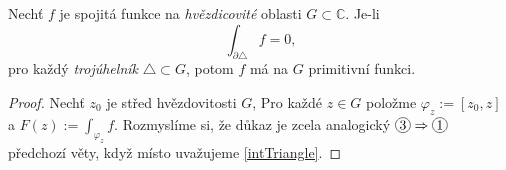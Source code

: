 \begin{amendment}
Nechť $f$ je spojitá funkce na \emph{hvězdicovité} oblasti $G\subset\mathbb{C}.$ Je-li
\begin{equation}\label{intTriangle}
    \int_{\partial\triangle}f=0\text{,}
\end{equation}
pro každý \emph{trojúhelník} $\triangle\subset G$, potom $f$ má na $G$ primitivní funkci.
\end{amendment}

\begin{proof}
Nechť $z_0$ je střed hvězdovitosti $G$, Pro každé $z\in G$ položme $\varphi_z:=[z_0,z]$ a $F(z):=\int_{\varphi_z}f\text{.}$ 
Rozmyslíme si, že důkaz
je zcela analogický $\circled{3}\Rightarrow\circled{1}$ předchozí věty, když místo  uvažujeme \cref{intTriangle}.
\end{proof}